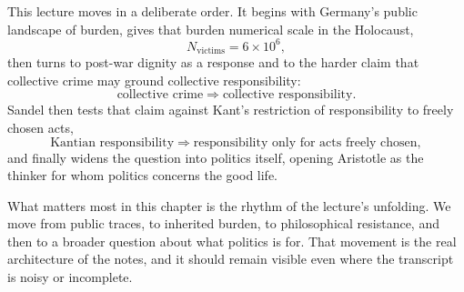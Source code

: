 This lecture moves in a deliberate order. It begins with Germany's public landscape of burden, gives that burden numerical scale in the Holocaust,
\begin{equation}
N_{\text{victims}} = 6 \times 10^6,
\end{equation}
then turns to post-war dignity as a response and to the harder claim that collective crime may ground collective responsibility:
\begin{equation}
\text{collective crime}
\Longrightarrow
\text{collective responsibility}.
\end{equation}
Sandel then tests that claim against Kant's restriction of responsibility to freely chosen acts,
\begin{equation}
\text{Kantian responsibility}
\Longrightarrow
\text{responsibility only for acts freely chosen},
\end{equation}
and finally widens the question into politics itself, opening Aristotle as the thinker for whom politics concerns the good life.

What matters most in this chapter is the rhythm of the lecture's unfolding. We move from public traces, to inherited burden, to philosophical resistance, and then to a broader question about what politics is for. That movement is the real architecture of the notes, and it should remain visible even where the transcript is noisy or incomplete.